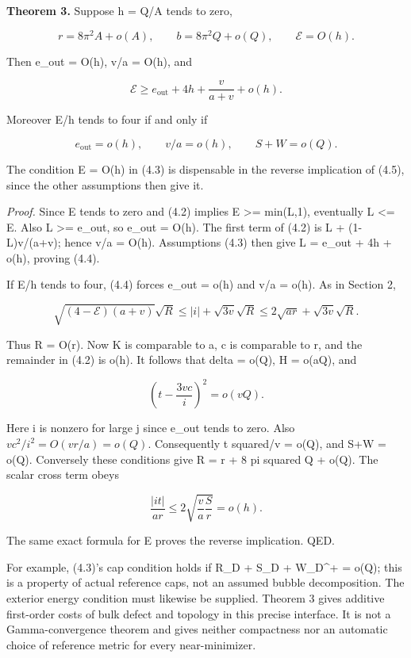 \documentclass[
  10pt,
]{article}
\begin{document}
\textbf{Theorem 3.} Suppose h = Q/A tends to zero,

\[
 r=8\pi^2A+o(A),\qquad b=8\pi^2Q+o(Q),
                    \qquad\mathcal E=O(h).              \tag{4.3}
\]

Then e\_out = O(h), v/a = O(h), and

\[
 \boxed{\mathcal E\ge e_{\mathrm{out}}+4h+\frac{v}{a+v}+o(h).}
                                                               \tag{4.4}
\]

Moreover E/h tends to four if and only if

\[
 e_{\mathrm{out}}=o(h),\qquad v/a=o(h),\qquad S+W=o(Q).
                                                               \tag{4.5}
\]

The condition E = O(h) in (4.3) is dispensable in the reverse
implication of (4.5), since the other assumptions then give it.

\emph{Proof.} Since E tends to zero and (4.2) implies E \textgreater=
min(L,1), eventually L \textless= E. Also L \textgreater= e\_out, so
e\_out = O(h). The first term of (4.2) is L + (1-L)v/(a+v); hence v/a =
O(h). Assumptions (4.3) then give L = e\_out + 4h + o(h), proving (4.4).

If E/h tends to four, (4.4) forces e\_out = o(h) and v/a = o(h). As in
Section 2,

\[
 \sqrt{(4-\mathcal E)(a+v)}\sqrt R
                 \le |i|+\sqrt{3v}\sqrt R
                 \le2\sqrt{ar}+\sqrt{3v}\sqrt R.
\]

Thus R = O(r). Now K is comparable to a, c is comparable to r, and the
remainder in (4.2) is o(h). It follows that delta = o(Q), H = o(aQ), and

\[
 \left(t-\frac{3vc}{i}\right)^2=o(vQ).
\]

Here i is nonzero for large j since e\_out tends to zero. Also
\(v c^2/i^2=O(vr/a)=o(Q)\). Consequently t squared/v = o(Q), and S+W =
o(Q). Conversely these conditions give R = r + 8 pi squared Q + o(Q).
The scalar cross term obeys

\[
 \frac{|it|}{ar}\le
             2\sqrt{\frac{v}{a}\frac{S}{r}}=o(h).
\]

The same exact formula for E proves the reverse implication. QED.

For example, (4.3)'s cap condition holds if R\_D + S\_D + W\_D\^{}+ =
o(Q); this is a property of actual reference caps, not an assumed bubble
decomposition. The exterior energy condition must likewise be supplied.
Theorem 3 gives additive first-order costs of bulk defect and topology
in this precise interface. It is not a Gamma-convergence theorem and
gives neither compactness nor an automatic choice of reference metric
for every near-minimizer.
\end{document}
